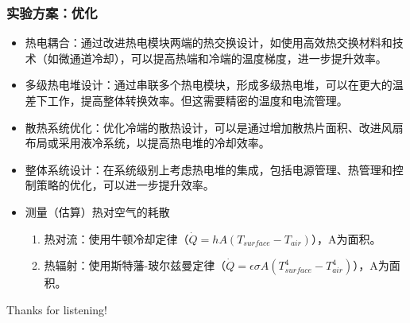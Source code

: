 \documentclass[aspectratio=169]{beamer}
\begin{document}
	\begin{frame}
		\frametitle{实验方案：优化}
		
		\begin{itemize}
			\item 热电耦合：通过改进热电模块两端的热交换设计，如使用高效热交换材料和技术（如\textcolor{c4}{微通道冷却}），可以提高热端和冷端的温度梯度，进一步提升效率。
			
			\item \textcolor{c4}{多级热电堆}设计：通过串联多个热电模块，形成多级热电堆，可以在更大的温差下工作，提高整体转换效率。但这需要精密的温度和电流管理。
			
			\item 散热系统优化：\textcolor{c4}{优化冷端的散热设计}，可以是通过增加散热片面积、改进风扇布局或采用液冷系统，以提高热电堆的冷却效率。
			
			\item 整体系统设计：\textcolor{c4}{在系统级别上考虑热电堆的集成}，包括电源管理、热管理和控制策略的优化，可以进一步提升效率。
			
			\item 测量（估算）热对空气的耗散
			\begin{enumerate}
				\item 热对流：使用牛顿冷却定律（$\dot{Q}=hA(T_{surface}-T_{air})$），A为面积。
				\item 热辐射：使用斯特藩-玻尔兹曼定律（$\dot{Q}=\epsilon\sigma A(T^4_{surface}-T^4_{air})$），A为面积。				
			\end{enumerate}
		\end{itemize}
		
	\end{frame}
	
	
	
	\begin{frame}[plain]
		
		\begin{center}
			{\Huge\calligra Thanks for listening!}
		\end{center}
		
	\end{frame}
	
	
	
	
	
	
	
\end{document}
